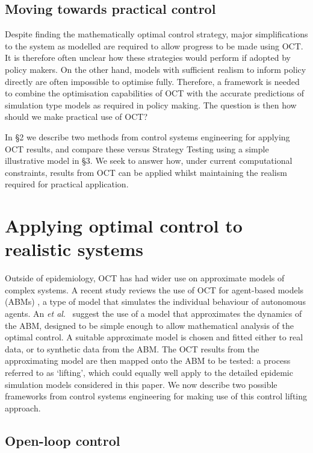 \subsection*{Moving towards practical control}

Despite finding the mathematically optimal control strategy, major simplifications to the system as modelled are required to allow progress to be made using OCT. It is therefore often unclear how these strategies would perform if adopted by policy makers. On the other hand, models with sufficient realism to inform policy directly are often impossible to optimise fully. Therefore, a framework is needed to combine the optimisation capabilities of OCT with the accurate predictions of simulation type models as required in policy making. The question is then how should we make practical use of OCT?

In \S2 we describe two methods from control systems engineering for applying OCT results, and compare these versus Strategy Testing using a simple illustrative model in \S3. We seek to answer how, under current computational constraints, results from OCT can be applied whilst maintaining the realism required for practical application.

\section{Applying optimal control to realistic systems}
\label{sec:ApplyingOptimalControl}

Outside of epidemiology, OCT has had wider use on approximate models of complex systems. A recent study reviews the use of OCT for agent-based models (ABMs) \citep{an_optimization_2017}, a type of model that simulates the individual behaviour of autonomous agents. An \textit{et al}.\ \citep{an_optimization_2017} suggest the use of a model that approximates the dynamics of the ABM, designed to be simple enough to allow mathematical analysis of the optimal control. A suitable approximate model is chosen and fitted either to real data, or to synthetic data from the ABM. The OCT results from the approximating model are then mapped onto the ABM to be tested: a process referred to as `lifting', which could equally well apply to the detailed epidemic simulation models considered in this paper. We now describe two possible frameworks from control systems engineering for making use of this control lifting approach.

\subsection*{Open-loop control}

